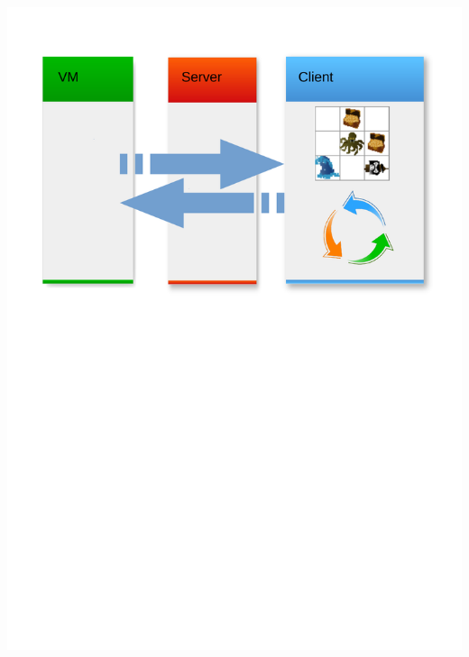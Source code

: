 \begin{frame}
	\begin{center}
		\includegraphics[scale=0.5]{simulation/Simulation2.pdf}
	\end{center}
\end{frame}

